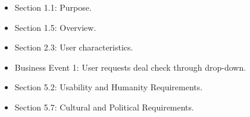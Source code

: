 \documentclass[]{article}
\begin{document}
\begin{itemize}
    \item Section 1.1: Purpose.
    \item Section 1.5: Overview.
    \item Section 2.3: User characteristics.
    \item Business Event 1: User requests deal check through drop-down.
    \item Section 5.2: Usability and Humanity Requirements.
    \item Section 5.7: Cultural and Political Requirements.
\end{itemize}




\end{document}
